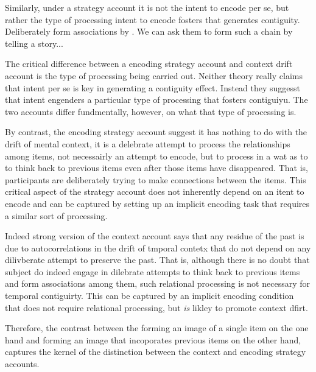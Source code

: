 
Similarly, under a strategy account it is not the intent to encode per se, but rather the type of processing intent to encode fosters that generates contiguity. Deliberately form associations by . We can ask them to form such a chain by telling a story... 


The critical difference between a encoding strategy account and context drift account is the type of processing being carried out. Neither theory really claims that intent per se is key in generating a contiguity effect. Instead they suggesst that intent engenders a particular type of processing that fosters contiguiyu. The two accounts differ fundmentally, however, on what that type of processing is. 



By contrast, the encoding strategy account suggest it has nothing to do with the drift of mental context, it is a delebrate attempt to process the relationships among items, not necessairly an attempt to encode, but to process in a wat as to to think back to previous items even after those items have disappeared. That is, participants are deliberately trying to make connections between the items. This critical aspect of the strategy account does not inherently depend on an itent to encode and can be captured by setting up an implicit encoding task that requires a similar sort of processing. 






Indeed strong version of the context account says that any residue of the past is due to autocorrelations in the drift of tmporal contetx that do not depend on any dilivberate attempt to preserve the past. That is, although there is no doubt that subject do indeed engage in dilebrate attempts to think back to previous items and form associations among them, such relational processing is not necessary for temporal contiguirty. This can be captured by an implicit encoding condition that does not require relational processing, but \emph{is} likley to promote context dfirt.

Therefore, the contrast between the forming an image of a single item on the one hand and forming an image that incoporates previous items on the other hand, captures the kernel of the distinction between the context and encoding strategy accounts.